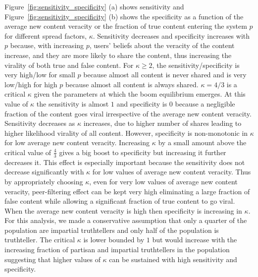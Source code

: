 Figure~\ref{fig:sensitivity_specificity} (a) shows sensitivity and Figure~\ref{fig:sensitivity_specificity} (b) shows the specificity as a function of the average new content veracity or the fraction of true content entering the system $p$ for different spread factors, $\kappa$. Sensitivity decreases and specificity increases with $p$ because, with increasing $p$, users' beliefs about the veracity of the content increase, and they are more likely to share the content, thus increasing the virality of both true and false content. For $\kappa \geq 2$, the sensitivity/specificity is very high/low for small $p$ because almost all content is never shared and is very low/high for high $p$ because almost all content is always shared. $\kappa = 4/3$ is a critical $\kappa$ given the parameters at which the boom equilibrium emerges. At this value of $\kappa$ the sensitivity is almost $1$ and specificity is $0$ because a negligible fraction of the content goes viral irrespective of the average new content veracity. Sensitivity decreases as $\kappa$ increases, due to higher number of shares leading to higher likelihood virality of all content. However, specificity is non-monotonic in $\kappa$ for low average new content veracity. Increasing $\kappa$ by a small amount above the critical value of $\frac{4}{3}$ gives a big boost to specificity but increasing it further decreases it. This effect is especially important because the sensitivity does not decrease significantly with $\kappa$ for low values of average new content veracity. Thus by appropriately choosing $\kappa$, even for very low values of average new content veracity, peer-filtering effect can be kept very high eliminating a large fraction of false content while allowing a significant fraction of true content to go viral. When the average new content veracity is high then specificity is increasing in $\kappa$. For this analysis, we made a conservative assumption that only a quarter of the population are impartial truthtellers and only half of the population is truthteller. The critical $\kappa$ is lower bounded by $1$ but would increase with the increasing fraction of partisan and impartial truthtellers in the population suggesting that higher values of $\kappa$ can be sustained with high sensitivity and specificity.




